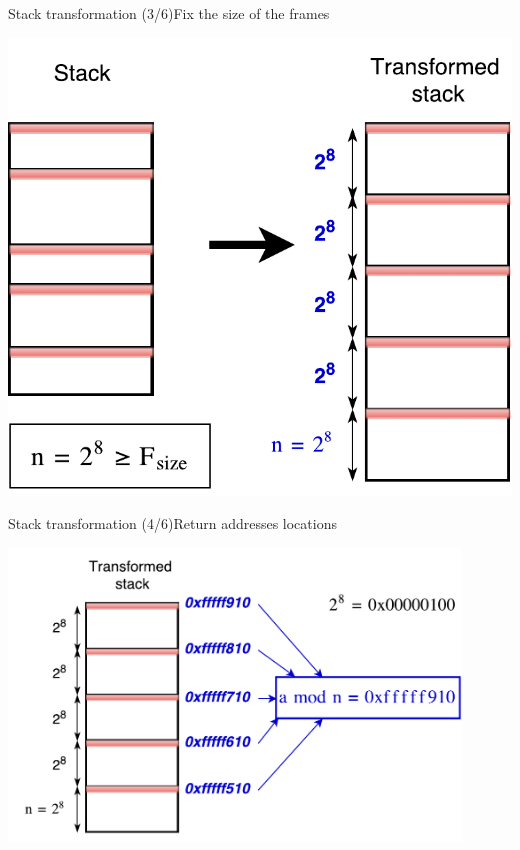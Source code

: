 \documentclass{beamer}
\begin{document}
\begin{frame}[c]{Stack transformation (3/6)}{Fix the size of the frames}
	\begin{center}
		\includegraphics[height=0.7\textheight]{images/stack_transfo_2.pdf}
	\end{center}
\end{frame}
\begin{frame}[c]{Stack transformation (4/6)}{Return addresses locations}
	\begin{center}
   		\includegraphics[width=0.9\textwidth]{images/stack_transfo_3.pdf}
	\end{center}
\end{frame}
\end{document}
